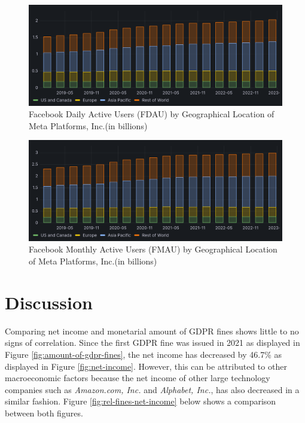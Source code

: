 \documentclass[12pt, a4paper]{article}
\begin{document}
\begin{figure}[H]
    \centering
    \includegraphics[width=1.00\textwidth]{facebook-dau}
    \caption{Facebook Daily Active Users (FDAU) by Geographical Location of Meta
    Platforms, Inc.(in billions)\cite{2023q1,2021q2Slides,2019q4Slides}}
    \label{fig:facebook-dau}
\end{figure}

\begin{figure}[H]
    \centering
    \includegraphics[width=1.00\textwidth]{facebook-mau}
    \caption{Facebook Monthly Active Users (FMAU) by Geographical Location of
    Meta Platforms, Inc.(in billions)\cite{2023q1,2021q2Slides,2019q4Slides}}
    \label{fig:facebook-mau}
\end{figure}

\section*{Discussion}




Comparing net income and monetarial amount of GDPR fines shows little to no
signs of correlation. Since the first GDPR fine was issued in 2021 as displayed
in Figure \ref{fig:amount-of-gdpr-fines}, the net income has decreased by 46.7\%
as displayed in Figure \ref{fig:net-income}. However, this can be attributed to
other macroeconomic factors because the net income of other large technology
companies such as \textit{Amazon.com, Inc.} and \textit{Alphabet, Inc.}, has
also decreased in a similar fashion\cite{amznNetIncome,googleNetIncome}. Figure
\ref{fig:rel-fines-net-income} below shows a comparison between both figures.
\end{document}
